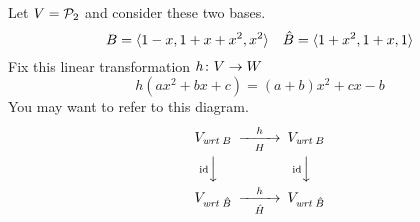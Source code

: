\documentclass[answers, nolegalese, 11pt]{examjh}
\begin{document}
\thispagestyle{empty}
\vspace{-1ex}
\makebox[\textwidth]{\hbox{}\hrulefill\hbox{}}

Let $V=\mathcal{P}_2$ and consider these two bases.
\begin{equation*}
B=\langle1-x, 1+x+x^2, x^2\rangle
\quad
\hat{B}=\langle1+x^2, 1+x, 1\rangle
\end{equation*}
Fix this linear transformation  $\mbox{$h\colon V\to W$}$
\begin{equation*}
  h(ax^2+bx+c)=(a+b)x^2+cx-b
\end{equation*}
You may want to refer to this diagram.
\begin{equation*}
  \begin{CD}
    V_{\wrt{B}}                   @>h>H>        V_{\wrt{B}}       \\
    @V{\text{\scriptsize$\identity$}} VV                @V{\text{\scriptsize$\identity$}} VV \\
    V_{\wrt{\hat{B}}}             @>h>\hat{H}>  V_{\wrt{\hat{B}}}
  \end{CD}
\end{equation*}
\end{document}
